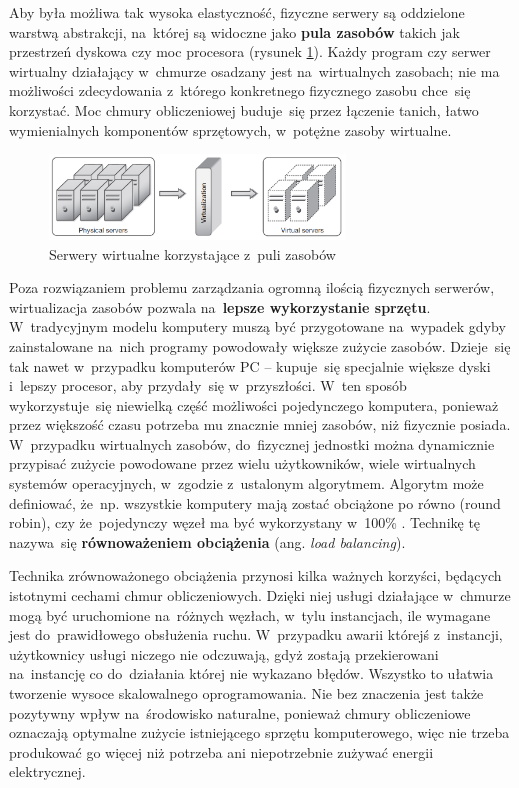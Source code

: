 \documentclass[12pt,a4paper,twoside,titlepage,openright]{book}
\begin{document}
Aby była możliwa tak wysoka elastyczność, fizyczne serwery są oddzielone warstwą abstrakcji, na~której są widoczne jako \textbf{pula zasobów} takich jak przestrzeń dyskowa czy moc procesora (rysunek \ref{fig:pooling}). Każdy program czy serwer wirtualny działający w~chmurze osadzany jest na~wirtualnych zasobach; nie ma możliwości zdecydowania z~którego konkretnego fizycznego zasobu chce~się korzystać. Moc chmury obliczeniowej buduje~się przez łączenie tanich, łatwo wymienialnych komponentów sprzętowych, w~potężne zasoby wirtualne. \cite{ccCambridge}

\begin{figure}[h]
	\centering
			\includegraphics[width=0.7\textwidth]{pooling.png}
		\caption{Serwery wirtualne korzystające z~puli zasobów \cite{ccCambridge}}
		\label{fig:pooling}
\end{figure}

Poza rozwiązaniem problemu zarządzania ogromną ilością fizycznych serwerów, wirtualizacja zasobów pozwala na~\textbf{lepsze wykorzystanie sprzętu}. W~tradycyjnym modelu komputery muszą być przygotowane na~wypadek gdyby zainstalowane na~nich programy powodowały większe zużycie zasobów. Dzieje~się tak nawet w~przypadku komputerów PC -- kupuje~się specjalnie większe dyski i~lepszy procesor, aby przydały~się w~przyszłości. W~ten sposób wykorzystuje~się niewielką część możliwości pojedynczego komputera, ponieważ przez większość czasu potrzeba mu znacznie mniej zasobów, niż fizycznie posiada. W~przypadku wirtualnych zasobów, do~fizycznej jednostki można dynamicznie przypisać zużycie powodowane przez wielu użytkowników, wiele wirtualnych systemów operacyjnych, w~zgodzie z~ustalonym algorytmem. Algorytm może definiować, że~np. wszystkie komputery mają zostać obciążone po równo (round robin), czy że~pojedynczy węzeł ma być wykorzystany w~100\% \cite{cloudFoundry}. Technikę tę nazywa~się \textbf{równoważeniem obciążenia} (ang. \textit{load balancing}).

Technika zrównoważonego obciążenia przynosi kilka ważnych korzyści, będących istotnymi cechami chmur obliczeniowych. Dzięki niej usługi działające w~chmurze mogą być uruchomione na~różnych węzłach, w~tylu instancjach, ile wymagane jest do~prawidłowego obsłużenia ruchu. W~przypadku awarii którejś z~instancji, użytkownicy usługi niczego nie odczuwają, gdyż zostają przekierowani na~instancję co do~działania której nie wykazano błędów. Wszystko to ułatwia tworzenie wysoce skalowalnego oprogramowania. Nie bez znaczenia jest także pozytywny wpływ na~środowisko naturalne, ponieważ chmury obliczeniowe oznaczają optymalne zużycie istniejącego sprzętu komputerowego, więc nie trzeba produkować go więcej niż potrzeba ani niepotrzebnie zużywać energii elektrycznej.
\end{document}
